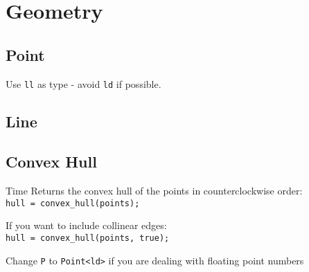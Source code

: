 \section{Geometry}

\subsection{Point}
Use \verb|ll| as type - avoid \verb|ld| if possible.



\subsection{Line}




\subsection{Convex Hull}
 Time
Returns the convex hull of the points in counterclockwise order: \\
\verb|hull = convex_hull(points);|

If you want to include collinear edges: \\
\verb|hull = convex_hull(points, true);|

Change \verb|P| to \verb|Point<ld>| if you are dealing with floating point numbers

